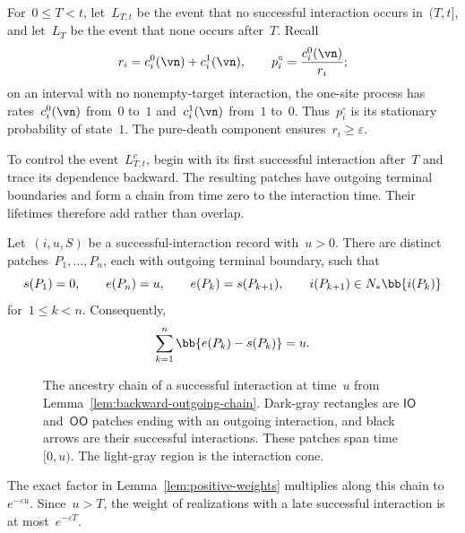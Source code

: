 For~$0\leq T<t$, let~$L_{T,t}$ be the event that no successful interaction
occurs in~$(T,t]$, and let~$L_T$ be the event that none occurs after~$T$.
Recall
\begin{equation*}
r_i=c_i^0(\vn)+c_i^1(\vn),
\qquad
p_i^\circ=\frac{c_i^0(\vn)}{r_i};
\end{equation*}
on an interval with no nonempty-target interaction, the one-site process has
rates~$c_i^0(\vn)$ from~$0$ to~$1$ and~$c_i^1(\vn)$ from~$1$ to~$0$.
Thus~$p_i^\circ$ is its stationary probability of state~$1$. The pure-death
component ensures~$r_i\geq\varepsilon$.

To control the event~$L_{T,t}^c$, begin with its first successful interaction
after~$T$ and trace its dependence backward. The resulting patches have
outgoing terminal boundaries and form a chain from time zero to the
interaction time. Their lifetimes therefore add rather than overlap.

\begin{lemma}
\label{lem:backward-outgoing-chain}
Let~$(i,u,S)$ be a successful-interaction record with~$u>0$. There are distinct
patches~$P_1,\ldots,P_n$, each with outgoing terminal boundary, such that
\begin{equation*}
s(P_1)=0,
\qquad
e(P_n)=u,
\qquad
e(P_k)=s(P_{k+1}),
\qquad
i(P_{k+1})\in N_*\bb{i(P_k)}
\end{equation*}
for~$1\leq k<n$. Consequently,
\begin{equation}
\label{eq:outgoing-chain-total-length}
\sum_{k=1}^n\bb{e(P_k)-s(P_k)}=u.
\end{equation}
\end{lemma}

\begin{figure}[htbp]
\centering

\caption{The ancestry chain of a successful interaction at time~$u$ from
Lemma~\ref{lem:backward-outgoing-chain}. Dark-gray rectangles are
$\mathsf{IO}$ and~$\mathsf{OO}$ patches ending with an outgoing interaction, and
black arrows are their successful interactions. These patches span time~$[0,u)$. The light-gray
region is the interaction cone.}
\label{fig:backward-outgoing-chain}
\end{figure}
\FloatBarrier

The exact factor in Lemma~\ref{lem:positive-weights} multiplies along this
chain to~$e^{-\varepsilon u}$. Since~$u>T$, the weight of realizations with a
late successful interaction is at most~$e^{-\varepsilon T}$.

